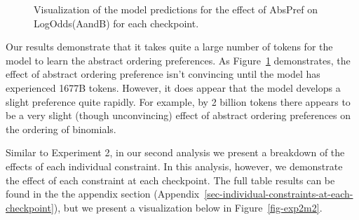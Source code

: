 \documentclass[
  12pt,
  letterpaper,
]{scrreport}
\begin{document}
\begin{figure}[htbp]

\caption{\label{fig-exp2m1}Visualization of the model predictions for
the effect of AbsPref on LogOdds(AandB) for each checkpoint.}


\end{figure}%

Our results demonstrate that it takes quite a large number of tokens for
the model to learn the abstract ordering preferences. As
Figure~\ref{fig-exp2m1} demonstrates, the effect of abstract ordering
preference isn't convincing until the model has experienced 1677B
tokens. However, it does appear that the model develops a slight
preference quite rapidly. For example, by 2 billion tokens there appears
to be a very slight (though unconvincing) effect of abstract ordering
preferences on the ordering of binomials.

Similar to Experiment 2, in our second analysis we present a breakdown
of the effects of each individual constraint. In this analysis, however,
we demonstrate the effect of each constraint at each checkpoint. The
full table results can be found in the the appendix section
(Appendix~\ref{sec-individual-constraints-at-each-checkpoint}), but we
present a visualization below in Figure~\ref{fig-exp2m2}.
\end{document}

